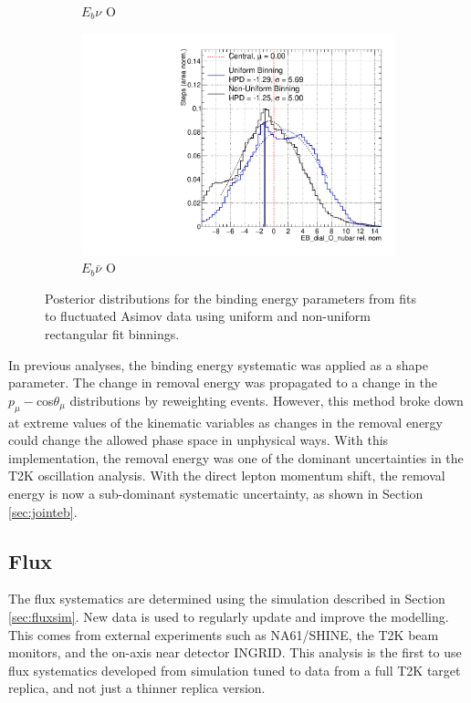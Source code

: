 \begin{figure}
\begin{subfigure}{.48\textwidth}
  \caption{$E_{b}\nu$ O}
\end{subfigure}
\begin{subfigure}{.48\textwidth}
  \centering
  \includegraphics[width=0.73\linewidth]{figs/EB_dial_O_nubarFluc2}
  \caption{$E_{b}\bar{\nu}$ O}
\end{subfigure}
\caption{Posterior distributions for the binding energy parameters from fits to fluctuated Asimov data using uniform and non-uniform rectangular fit binnings.}
\label{fig:Ebfluc}
\end{figure}

In previous analyses, the binding energy systematic was applied as a shape parameter. The change in removal energy was propagated to a change in the $p_{\mu}-$cos$\theta_{\mu}$ distributions by reweighting events. However, this method broke down at extreme values of the kinematic variables as changes in the removal energy could change the allowed phase space in unphysical ways. With this implementation, the removal energy was one of the dominant uncertainties in the T2K oscillation analysis. With the direct lepton momentum shift, the removal energy is now a sub-dominant systematic uncertainty, as shown in Section \ref{sec:jointeb}.

\subsection{Flux}\label{sec:flux}

The flux systematics are determined using the simulation described in Section \ref{sec:fluxsim}. New data is used to regularly update and improve the modelling. This comes from external experiments such as NA61/SHINE\cite{na61}, the T2K beam monitors, and the on-axis near detector INGRID. This analysis is the first to use flux systematics developed from simulation tuned to data from a full T2K target replica, and not just a thinner replica version.

